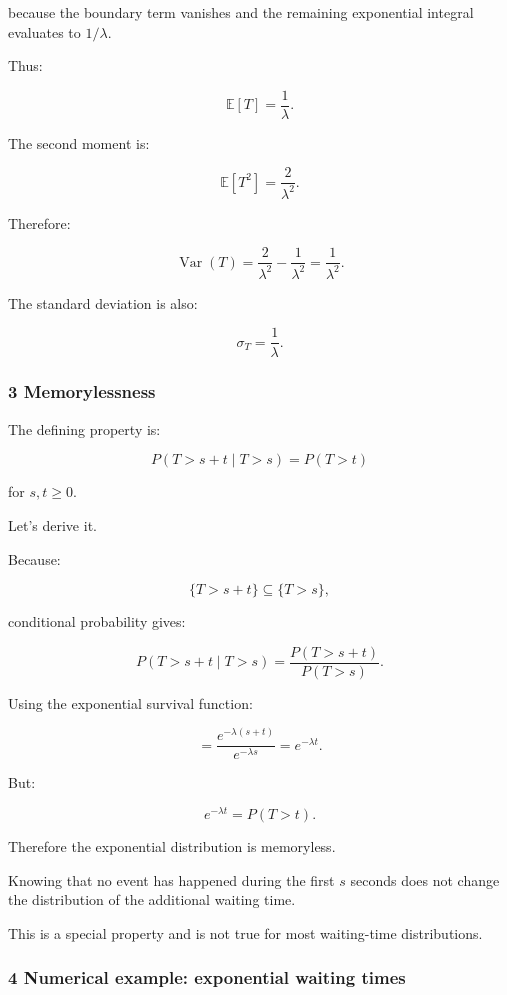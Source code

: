 because the boundary term vanishes and the remaining exponential integral evaluates to \(1/\lambda\).

Thus:

\[
 \boxed{ \mathbb E[T]=\frac1\lambda }.
\]

The second moment is:

\[
 \mathbb E[T^2]=\frac2{\lambda^2}.
\]

Therefore:

\[
 \operatorname{Var}(T) = \frac2{\lambda^2} -\frac1{\lambda^2} = \boxed{\frac1{\lambda^2}}.
\]

The standard deviation is also:

\[
 \sigma_T=\frac1\lambda.
\]

\subsubsection{3 Memorylessness}\label{02-foundations-ii-ch024-memorylessness}

\hypertarget{02-foundations-ii-ch024-memorylessness}{}

The defining property is:

\[
 \boxed{ P(T>s+t\mid T>s)=P(T>t) }
\]

for \(s,t\ge0\).

Let's derive it.

Because:

\[
 \{T>s+t\}\subseteq\{T>s\},
\]

conditional probability gives:

\[
 P(T>s+t\mid T>s) = \frac{P(T>s+t)}{P(T>s)}.
\]

Using the exponential survival function:

\[
 = \frac{e^{-\lambda(s+t)}}{e^{-\lambda s}} =e^{-\lambda t}.
\]

But:

\[
 e^{-\lambda t}=P(T>t).
\]

Therefore the exponential distribution is memoryless.

Knowing that no event has happened during the first \(s\) seconds does not change the distribution of the additional waiting time.

This is a special property and is not true for most waiting-time distributions.

\subsubsection{4 Numerical example: exponential waiting times}\label{02-foundations-ii-ch024-numerical-example-exponential-waiting-times}

